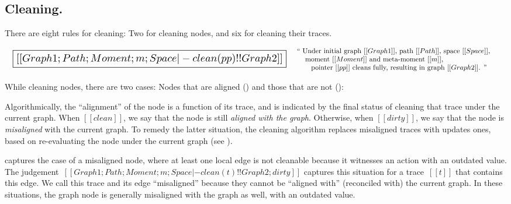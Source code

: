 \documentclass[11pt]{article}
\begin{document}
\subsection{Cleaning.}

There are eight rules for cleaning: Two for cleaning nodes, and six for cleaning their traces.

\[
\begin{array}{lc}
  {\scalebox{1.5}{
  \boxed{[[Graph1; Path; Moment; m; Space |- clean(pp) !! Graph2]]}}}
&
\begin{array}{p{4in}}
  ``
  Under initial graph~$[[Graph1]]$,
  path~$[[Path]]$,
  space~$[[Space]]$,\\
  \hspace{3mm}~moment~$[[Moment]]$ and meta-moment~$[[m]]$,\\
  \hspace{6mm}~pointer~$[[pp]]$ cleans fully,
  resulting in graph~$[[Graph2]]$.
  ''
\end{array}
\end{array}
\]

While cleaning nodes, there are two cases: Nodes that are aligned
() and those that are not ():

\begin{mathpar}
\end{mathpar}

Algorithmically, the ``alignment'' of the node is a function of its trace, and is indicated by the final status of cleaning that trace under the current graph.
%
When $[[clean]]$, we say that the node is still \emph{aligned with the graph}.
Otherwise, when $[[dirty]]$, we say that the node is \emph{misaligned} with the current graph.
%
To remedy the latter situation, the cleaning algorithm replaces misaligned traces with updates ones,
based on re-evaluating the node under the current graph (see ).
%

 captures the case of a misaligned node, where at least one
local edge is not cleanable because it witnesses an action with an
outdated value.
%
The judgement~$[[Graph1; Path; Moment; m; Space |- clean(t) !!
    Graph2; dirty]]$ captures this situation for a trace~$[[t]]$ that contains this edge.
%
We call this trace and its edge ``misaligned'' because they cannot be ``aligned with''
(reconciled with) the current graph.
%
In these situations, the graph node is generally misaligned with the graph as well, with an outdated value.
\end{document}
